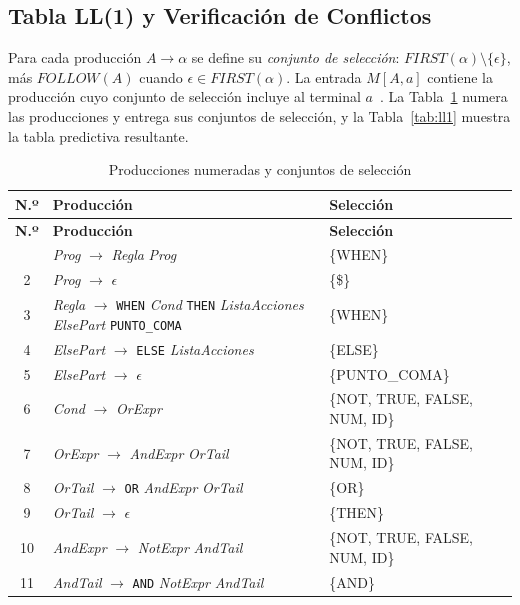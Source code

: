 \documentclass[12pt,a4paper]{article}
\begin{document}
\subsection{Tabla LL(1) y Verificación de Conflictos}
\label{sec:ll1}
Para cada producción $A \to \alpha$ se define su \textit{conjunto de selección}: $FIRST(\alpha) \setminus \{\epsilon\}$, más $FOLLOW(A)$ cuando $\epsilon \in FIRST(\alpha)$. La entrada $M[A,a]$ contiene la producción cuyo conjunto de selección incluye al terminal  $a$~\cite[Cap.~5]{navarrete}. La Tabla~\ref{tab:select} numera las producciones y entrega sus conjuntos de selección, y la Tabla~\ref{tab:ll1} muestra la tabla predictiva resultante.

{\small
\begin{longtable}{|c|>{\raggedright\arraybackslash}p{7.2cm}|>{\raggedright\arraybackslash}p{5.2cm}|}
\caption{Producciones numeradas y conjuntos de selección}\label{tab:select}\\
\hline \textbf{N.º} & \textbf{Producción} & \textbf{Selección}\\ \hline
\endfirsthead
\hline \textbf{N.º} & \textbf{Producción} & \textbf{Selección}\\ \hline
\endhead
\hline
\endfoot
1 & \textit{Prog} $\to$ \textit{Regla} \textit{Prog} & \{WHEN\}\\ \hline
2 & \textit{Prog} $\to$ $\epsilon$ & \{\$\}\\ \hline
3 & \textit{Regla} $\to$ \texttt{WHEN} \textit{Cond} \texttt{THEN} \textit{ListaAcciones} \textit{ElsePart} \texttt{PUNTO\_COMA} & \{WHEN\}\\ \hline
4 & \textit{ElsePart} $\to$ \texttt{ELSE} \textit{ListaAcciones} & \{ELSE\}\\ \hline
5 & \textit{ElsePart} $\to$ $\epsilon$ & \{PUNTO\_COMA\}\\ \hline
6 & \textit{Cond} $\to$ \textit{OrExpr} & \{NOT, TRUE, FALSE, NUM, ID\}\\ \hline
7 & \textit{OrExpr} $\to$ \textit{AndExpr} \textit{OrTail} & \{NOT, TRUE, FALSE, NUM, ID\}\\ \hline
8 & \textit{OrTail} $\to$ \texttt{OR} \textit{AndExpr} \textit{OrTail} & \{OR\}\\ \hline
9 & \textit{OrTail} $\to$ $\epsilon$ & \{THEN\}\\ \hline
10 & \textit{AndExpr} $\to$ \textit{NotExpr} \textit{AndTail} & \{NOT, TRUE, FALSE, NUM, ID\}\\ \hline
11 & \textit{AndTail} $\to$ \texttt{AND} \textit{NotExpr} \textit{AndTail} & \{AND\}\\ \hline

\end{longtable}}
\end{document}
